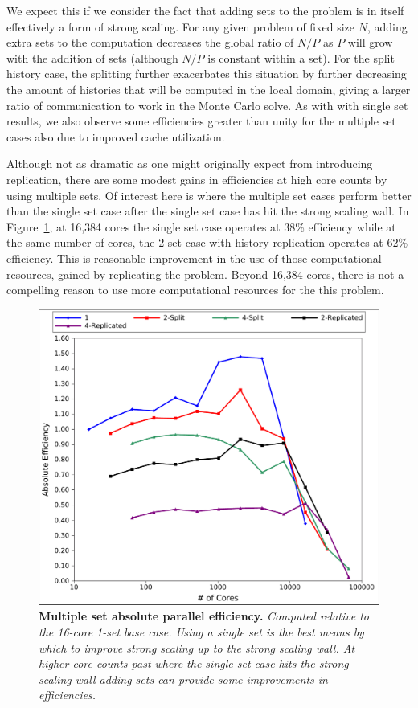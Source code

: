 We expect this if we consider the fact that adding sets to the problem
is in itself effectively a form of strong scaling. For any given
problem of fixed size $N$, adding extra sets to the computation
decreases the global ratio of $N/P$ as $P$ will grow with the addition
of sets (although $N/P$ is constant within a set). For the split
history case, the splitting further exacerbates this situation by
further decreasing the amount of histories that will be computed in
the local domain, giving a larger ratio of communication to work in
the Monte Carlo solve. As with with single set results, we also
observe some efficiencies greater than unity for the multiple set
cases also due to improved cache utilization. 

Although not as dramatic as one might originally expect from
introducing replication, there are some modest gains in efficiencies
at high core counts by using multiple sets. Of interest here is where
the multiple set cases perform better than the single set case after
the single set case has hit the strong scaling wall. In
Figure~\ref{fig:titan_strong_ms_eff}, at 16,384 cores the single set
case operates at 38\% efficiency while at the same number of cores,
the 2 set case with history replication operates at 62\%
efficiency. This is reasonable improvement in the use of those
computational resources, gained by replicating the problem. Beyond
16,384 cores, there is not a compelling reason to use more
computational resources for the this problem.

\begin{figure}[t!]
  \begin{center}
    \includegraphics[width=6in]{chapters/parallel_mc/titan_strong_ms_eff.pdf}
  \end{center}
  \caption{\textbf{Multiple set absolute parallel efficiency.}
    \textit{Computed relative to the 16-core 1-set base case. Using a
      single set is the best means by which to improve strong scaling
      up to the strong scaling wall. At higher core counts past where
      the single set case hits the strong scaling wall adding sets can
      provide some improvements in efficiencies.}}
  \label{fig:titan_strong_ms_eff}
\end{figure}

